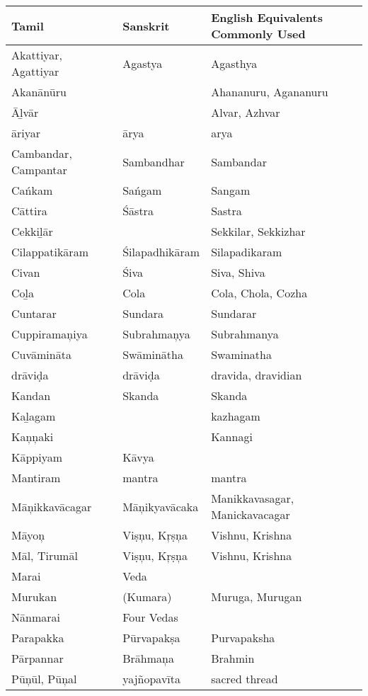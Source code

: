 \begin{longtable}{|p{2.5cm}|p{2.5cm}|p{3cm}|}
\hline
Tamil & Sanskrit & English Equivalents Commonly Used \\
\hline
Akattiyar, Agattiyar & Agastya & Agasthya \\
\hline
Akanānūru &  & Ahananuru, Agananuru \\
\hline
Āḻvār &  & Alvar, Azhvar \\
\hline
āriyar & ārya & arya \\
\hline
Cambandar, Campantar & Sambandhar & Sambandar \\
\hline
Cańkam & Sańgam & Sangam \\
\hline
Cāttira & Śāstra & Sastra \\
\hline
Cekkiḻār &  & Sekkilar, Sekkizhar \\
\hline
Cilappatikāram & Śilapadhikāram & Silapadikaram \\
\hline
Civan & Śiva & Siva, Shiva \\
\hline
Coḻa & Cola & Cola, Chola, Cozha \\
\hline
Cuntarar & Sundara & Sundarar \\
\hline
Cuppiramaņiya & Subrahmaņya & Subrahmanya \\
\hline
Cuvāmināta & Swāminātha & Swaminatha \\
\hline
drāviḍa & drāviḍa & dravida, dravidian \\
\hline
Kandan & Skanda & Skanda \\
\hline
Kaḻagam &  & kazhagam \\
\hline
Kaņņaki &  & Kannagi \\
\hline
Kāppiyam & Kāvya &  \\
\hline
Mantiram & mantra & mantra \\
\hline
Māņikkavācagar & Māņikyavācaka & Manikkavasagar, Manickavacagar \\
\hline
Māyoņ & Viṣņu, Kŗṣņa & Vishnu, Krishna \\
\hline
Māl, Tirumāl & Viṣņu, Kŗṣņa & Vishnu, Krishna \\
\hline
Marai & Veda &  \\
\hline
Murukan & (Kumara) & Muruga, Murugan \\
\hline
Nānmarai & Four Vedas &  \\
\hline
Parapakka & Pūrvapakṣa & Purvapaksha \\
\hline
Pārpannar & Brāhmaņa & Brahmin \\
\hline
Pūņūl, Pūņal & yajñopavīta & sacred thread \\

\end{longtable}

